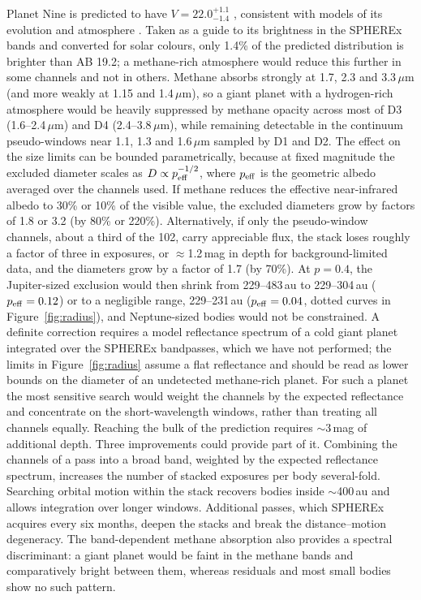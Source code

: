 \documentclass[twocolumn,linenumbers]{aastex702}
\begin{document}
Planet Nine is predicted to have $V = 22.0^{+1.1}_{-1.4}$ \citep{brown24}, consistent with models of its evolution and atmosphere \citep{fortney16,linder16}. Taken as a guide to its brightness in the SPHEREx bands and converted for solar colours, only 1.4\% of the predicted distribution is brighter than AB 19.2; a methane-rich atmosphere would reduce this further in some channels and not in others. Methane absorbs strongly at 1.7, 2.3 and 3.3\,$\mu$m (and more weakly at 1.15 and 1.4\,$\mu$m), so a giant planet with a hydrogen-rich atmosphere would be heavily suppressed by methane opacity across most of D3 (1.6--2.4\,$\mu$m) and D4 (2.4--3.8\,$\mu$m), while remaining detectable in the continuum pseudo-windows near 1.1, 1.3 and 1.6\,$\mu$m sampled by D1 and D2. The effect on the size limits can be bounded parametrically, because at fixed magnitude the excluded diameter scales as $D \propto p_{\rm eff}^{-1/2}$, where $p_{\rm eff}$ is the geometric albedo averaged over the channels used. If methane reduces the effective near-infrared albedo to 30\% or 10\% of the visible value, the excluded diameters grow by factors of 1.8 or 3.2 (by 80\% or 220\%). Alternatively, if only the pseudo-window channels, about a third of the 102, carry appreciable flux, the stack loses roughly a factor of three in exposures, or $\approx$1.2\,mag in depth for background-limited data, and the diameters grow by a factor of 1.7 (by 70\%). At $p = 0.4$, the Jupiter-sized exclusion would then shrink from 229--483\,au to 229--304\,au ($p_{\rm eff} = 0.12$) or to a negligible range, 229--231\,au ($p_{\rm eff} = 0.04$, dotted curves in Figure~\ref{fig:radius}), and Neptune-sized bodies would not be constrained. A definite correction requires a model reflectance spectrum of a cold giant planet \citep[e.g.,][]{fortney16,linder16} integrated over the SPHEREx bandpasses, which we have not performed; the limits in Figure~\ref{fig:radius} assume a flat reflectance and should be read as lower bounds on the diameter of an undetected methane-rich planet. For such a planet the most sensitive search would weight the channels by the expected reflectance and concentrate on the short-wavelength windows, rather than treating all channels equally. Reaching the bulk of the prediction requires $\sim$3\,mag of additional depth. Three improvements could provide part of it. Combining the channels of a pass into a broad band, weighted by the expected reflectance spectrum, increases the number of stacked exposures per body several-fold. Searching orbital motion within the stack recovers bodies inside $\sim$400\,au and allows integration over longer windows. Additional passes, which SPHEREx acquires every six months, deepen the stacks and break the distance--motion degeneracy. The band-dependent methane absorption also provides a spectral discriminant: a giant planet would be faint in the methane bands and comparatively bright between them, whereas residuals and most small bodies show no such pattern.
\end{document}
